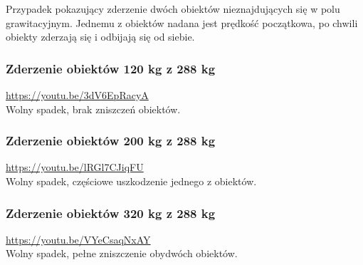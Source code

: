 \documentclass[12pt, letterpaper]{report}
\begin{document}
    Przypadek pokazujący zderzenie dwóch obiektów nieznajdujących się w polu grawitacyjnym.
    Jednemu z obiektów nadana jest prędkość początkowa, po chwili obiekty zderzają się i 
    odbijają się od siebie.

    \subsubsection{Zderzenie obiektów 120 kg z 288 kg}
    \url{https://youtu.be/3dV6EpRacyA} \\

    Wolny spadek, brak zniszczeń obiektów.

    \subsubsection{Zderzenie obiektów 200 kg z 288 kg}
    \url{https://youtu.be/lRGl7CJiqFU} \\

    Wolny spadek, częściowe uszkodzenie jednego z obiektów.

    \subsubsection{Zderzenie obiektów 320 kg z 288 kg}
    \url{https://youtu.be/VYeCsaqNxAY} \\

    Wolny spadek, pełne zniszczenie obydwóch obiektów.
\end{document}
